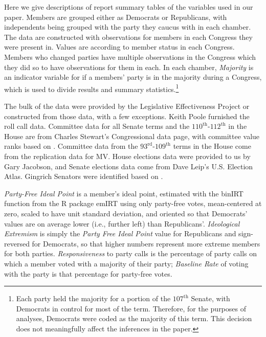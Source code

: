 \documentclass[12pt]{article}
\begin{document}
Here we give descriptions of report summary tables of the variables used in our paper. Members are grouped either as Democrats or Republicans, with independents being grouped with the party they caucus with in each chamber. The data are constructed with observations for members in each Congress they were present in. Values are according to member status in each Congress. Members who changed parties have multiple observations in the Congress which they did so to have observations for them in each. In each chamber, \textit{Majority} is an indicator variable for if a members' party is in the majority during a Congress, which is used to divide results and summary statistics.\footnote{\doublespacing\normalsize Each party held the majority for a portion of the $107^{\text{th}}$ Senate, with Democrats in control for most of the term.  Therefore, for the purposes of analyses, Democrats were coded as the majority of this term.  This decision does not meaningfully affect the inferences in the paper.}

The bulk of the data were provided by the Legislative Effectiveness Project \citep{Volden:2014} or constructed from those data, with a few exceptions. Keith Poole furnished the roll call data.  Committee data for all Senate terms and the $110^{\text{th}}$-$112^{\text{th}}$ in the House are from Charles Stewart's Congressional data page, with committee value ranks based on \citep{Groseclose:1998}.  Committee data from the $93^{\text{rd}}$-$109^{\text{th}}$ terms in the House come from the replication data for MV.  House elections data were provided to us by Gary Jacobson, and Senate elections data come from Dave Leip's U.S. Election Atlas.
Gingrich Senators were identified based on \citep{Theriault:2013}.

\textit{Party-Free Ideal Point} is a member's ideal point, estimated with the \textsf{binIRT} function from the \textsf{R} package \textsf{emIRT} using only party-free votes, mean-centered at zero, scaled to have unit standard deviation, and oriented so that Democrats' values are on average lower (i.e., further left) than Republicans'. \textit{Ideological Extremism} is simply the \textit{Party Free Ideal Point} value for Republicans and sign-reversed for Democrats, so that higher numbers represent more extreme members for both parties. \textit{Responsiveness} to party calls is the percentage of party calls on which a member voted with a majority of their party; \textit{Baseline Rate}  of voting with the party is that percentage for party-free votes.
\end{document}
